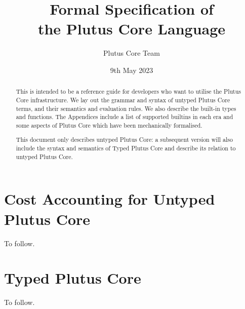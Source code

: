 \documentclass[a4paper]{article}
\title{Formal Specification of\\the Plutus Core Language}
\date{9th May 2023}
\author{Plutus Core Team}
\begin{document}
\maketitle

\begin{center}
  \LARGE{}
\end{center}

\begin{abstract}
  This is intended to be a reference guide for developers who want to utilise
  the Plutus Core infrastructure.  We lay out the grammar and syntax of untyped
  Plutus Core terms, and their semantics and evaluation rules.  We also describe
  the built-in types and functions.  The Appendices include a list of supported
  builtins in each era and some aspects of Plutus Core which have been
  mechanically formalised.
  
  This document only describes untyped Plutus Core: a subsequent version will also
  include the syntax and semantics of Typed Plutus Core and describe its relation to
  untyped Plutus Core.
\end{abstract}

\newpage
\tableofcontents
\newpage







\section{Cost Accounting for Untyped Plutus Core}
To follow.
\section{Typed Plutus Core}
To follow.

\begin{appendices}






\end{appendices}

\newpage


\newpage
\printnomenclature[2cm]  %
\end{document}
